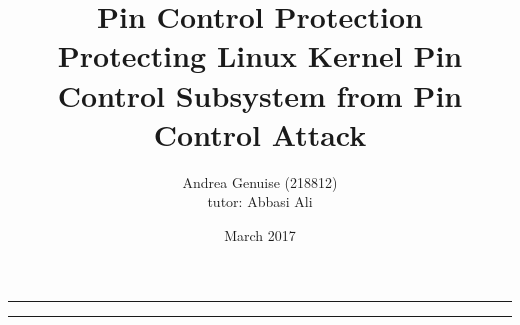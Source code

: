 \documentclass[a4paper,12pt]{article}
\begin{document}
\title{Pin Control Protection
\\
{\normalsize Protecting Linux Kernel Pin Control Subsystem from Pin Control Attack}
}
\author{Andrea Genuise (218812)
\\
{\normalsize tutor: Abbasi Ali}
}
\date{March 2017}
\maketitle

\vfill
\rule{\textwidth}{1pt}
\tableofcontents
\rule{\textwidth}{1pt}
\vfill






%
%

\begin{thebibliography}{99}


\end{thebibliography}


\begin{appendices}
\setcounter{table}{0}
\setcounter{figure}{0}
\renewcommand\thetable{\thesection\arabic{table}}
\renewcommand\thefigure{\thesection\arabic{figure}}



\end{appendices}
\end{document}
